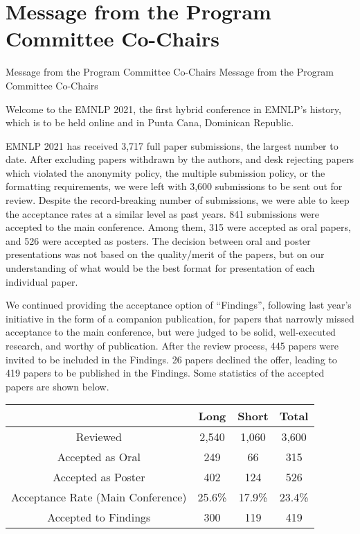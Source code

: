 \section{Message from the Program Committee Co-Chairs}
\setheaders%
    {Message from the Program Committee Co-Chairs}%
    {Message from the Program Committee Co-Chairs}
\thispagestyle{emptyheader}

\setlength{\parskip}{.7ex}


Welcome to the EMNLP 2021, the first hybrid conference in EMNLP’s history, which is to be held online and in Punta Cana, Dominican Republic.

EMNLP 2021 has received 3,717 full paper submissions, the largest number to date. After excluding papers withdrawn by the authors, and desk rejecting papers which violated the anonymity policy, the multiple submission policy, or the formatting requirements, we were left with 3,600 submissions to be sent out for review. Despite the record-breaking number of submissions, we were able to keep the acceptance rates at a similar level as past years. 841 submissions were accepted to the main conference. Among them, 315 were accepted as oral papers, and 526 were accepted as posters. The decision between oral and poster presentations was not based on the quality/merit of the papers, but on our understanding of what would be the best format for presentation of each individual paper.

We continued providing the acceptance option of ``Findings'', following last year’s initiative in the form of a companion publication, for papers that narrowly missed acceptance to the main conference, but were judged to be solid, well-executed research, and worthy of publication. After the review process, 445 papers were invited to be included in the Findings. 26 papers declined the offer, leading to 419 papers to be published in the Findings. Some statistics of the accepted papers are shown below.

\begin{table}[h]
    \begin{center}
\begin{tabular}[h]{|c|c|c|c|}
\hline
    &Long & Short & Total \\
\hline
    Reviewed & 2,540 &1,060  &3,600   \\
\hline
    Accepted as Oral & 249& 66 & 315   \\
\hline
    Accepted as Poster & 402 & 124 & 526  \\
   \hline
    Acceptance Rate (Main Conference) & 25.6\% & 17.9\% & 23.4\%  \\
\hline
   Accepted to Findings & 300 & 119 & 419  \\
\hline
\end{tabular}
    \end{center}
\end{table}

